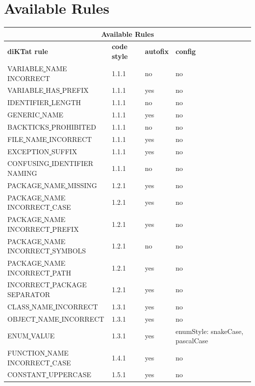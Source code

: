 \section*{Available Rules}
\scriptsize
\begin{longtable}{ |l|p{0.8cm}|p{0.8cm}| p{3cm} | }
\hline
\multicolumn{4}{|c|}{Available Rules} \\ 
\hline
\textbf{diKTat rule} & \textbf{code style} & \textbf{autofix} &  \textbf{config} \\
\hline
VARIABLE\underline{ }NAME\underline{ }INCORRECT & 1.1.1 &  no  &   no  \\
VARIABLE\underline{ }HAS\underline{ }PREFIX & 1.1.1 &  yes  &   no  \\
IDENTIFIER\underline{ }LENGTH & 1.1.1 &  no  &   no  \\
GENERIC\underline{ }NAME & 1.1.1 &  yes  &   no  \\
BACKTICKS\underline{ }PROHIBITED & 1.1.1 &  no  &   no  \\
FILE\underline{ }NAME\underline{ }INCORRECT & 1.1.1 &  yes  &   no  \\
EXCEPTION\underline{ }SUFFIX & 1.1.1 &  yes  &   no  \\
CONFUSING\underline{ }IDENTIFIER\underline{ }NAMING & 1.1.1 &  no  &   no  \\
PACKAGE\underline{ }NAME\underline{ }MISSING & 1.2.1 &  yes  &   no  \\
PACKAGE\underline{ }NAME\underline{ }INCORRECT\underline{ }CASE & 1.2.1 &  yes  &   no  \\
PACKAGE\underline{ }NAME\underline{ }INCORRECT\underline{ }PREFIX & 1.2.1 &  yes  &   no  \\
PACKAGE\underline{ }NAME\underline{ }INCORRECT\underline{ }SYMBOLS & 1.2.1 &  no  &   no  \\
PACKAGE\underline{ }NAME\underline{ }INCORRECT\underline{ }PATH & 1.2.1 &  yes  &   no  \\
INCORRECT\underline{ }PACKAGE\underline{ }SEPARATOR & 1.2.1 &  yes  &   no  \\
CLASS\underline{ }NAME\underline{ }INCORRECT & 1.3.1 &  yes  &   no  \\
OBJECT\underline{ }NAME\underline{ }INCORRECT & 1.3.1 &  yes  &   no  \\
ENUM\underline{ }VALUE & 1.3.1 &  yes  &   enumStyle: snakeCase, pascalCase  \\
FUNCTION\underline{ }NAME\underline{ }INCORRECT\underline{ }CASE & 1.4.1 &  yes  &   no  \\
CONSTANT\underline{ }UPPERCASE & 1.5.1 &  yes  &   no  \\

\end{longtable}
